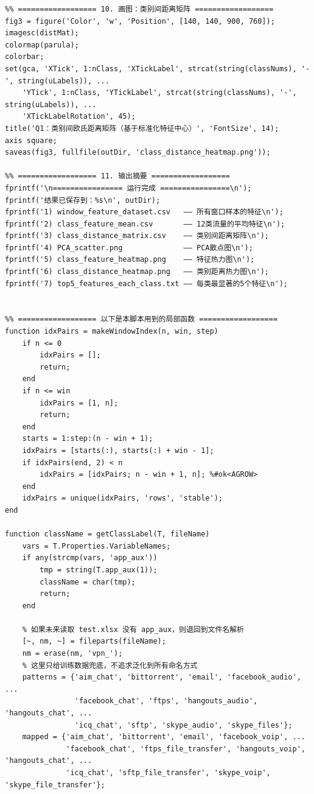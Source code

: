 \documentclass[UTF8,a4paper,12pt]{ctexart}
\begin{document}
\begin{lstlisting}
%% ================== 10. 画图：类别间距离矩阵 ==================
fig3 = figure('Color', 'w', 'Position', [140, 140, 900, 760]);
imagesc(distMat);
colormap(parula);
colorbar;
set(gca, 'XTick', 1:nClass, 'XTickLabel', strcat(string(classNums), '-', string(uLabels)), ...
    'YTick', 1:nClass, 'YTickLabel', strcat(string(classNums), '-', string(uLabels)), ...
    'XTickLabelRotation', 45);
title('Q1：类别间欧氏距离矩阵（基于标准化特征中心）', 'FontSize', 14);
axis square;
saveas(fig3, fullfile(outDir, 'class_distance_heatmap.png'));

%% ================== 11. 输出摘要 ==================
fprintf('\n================ 运行完成 ================\n');
fprintf('结果已保存到：%s\n', outDir);
fprintf('1) window_feature_dataset.csv   —— 所有窗口样本的特征\n');
fprintf('2) class_feature_mean.csv       —— 12类流量的平均特征\n');
fprintf('3) class_distance_matrix.csv    —— 类别间距离矩阵\n');
fprintf('4) PCA_scatter.png              —— PCA散点图\n');
fprintf('5) class_feature_heatmap.png    —— 特征热力图\n');
fprintf('6) class_distance_heatmap.png   —— 类别距离热力图\n');
fprintf('7) top5_features_each_class.txt —— 每类最显著的5个特征\n');


%% ================== 以下是本脚本用到的局部函数 ==================
function idxPairs = makeWindowIndex(n, win, step)
    if n <= 0
        idxPairs = [];
        return;
    end
    if n <= win
        idxPairs = [1, n];
        return;
    end
    starts = 1:step:(n - win + 1);
    idxPairs = [starts(:), starts(:) + win - 1];
    if idxPairs(end, 2) < n
        idxPairs = [idxPairs; n - win + 1, n]; %#ok<AGROW>
    end
    idxPairs = unique(idxPairs, 'rows', 'stable');
end

function className = getClassLabel(T, fileName)
    vars = T.Properties.VariableNames;
    if any(strcmp(vars, 'app_aux'))
        tmp = string(T.app_aux(1));
        className = char(tmp);
        return;
    end

    % 如果未来读取 test.xlsx 没有 app_aux，则退回到文件名解析
    [~, nm, ~] = fileparts(fileName);
    nm = erase(nm, 'vpn_');
    % 这里只给训练数据兜底，不追求泛化到所有命名方式
    patterns = {'aim_chat', 'bittorrent', 'email', 'facebook_audio', ...
                'facebook_chat', 'ftps', 'hangouts_audio', 'hangouts_chat', ...
                'icq_chat', 'sftp', 'skype_audio', 'skype_files'};
    mapped = {'aim_chat', 'bittorrent', 'email', 'facebook_voip', ...
              'facebook_chat', 'ftps_file_transfer', 'hangouts_voip', 'hangouts_chat', ...
              'icq_chat', 'sftp_file_transfer', 'skype_voip', 'skype_file_transfer'};


\end{lstlisting}
\end{document}
